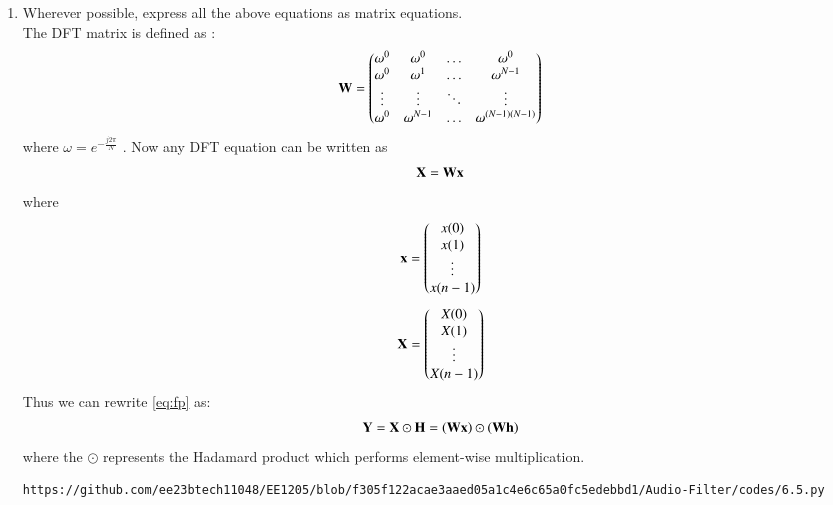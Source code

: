 \documentclass[journal,12pt,twocolumn]{IEEEtran}
\theoremstyle{remark}
\begin{document}
\begin{enumerate}[label=\thesection.\arabic*,ref=\thesection.\theenumi]
\item Wherever possible, express all the above equations as matrix equations.\\
\solution The DFT matrix is defined as : 
\begin{align}
	\mathbf{W} = 
	\begin{pmatrix}
		\omega^0 & \omega^0 & \ldots & \omega^0 \\
		\omega^0 & \omega^1 & \ldots & \omega^{N - 1} \\
		\vdots & \vdots & \ddots & \vdots \\
		\omega^0 & \omega^{N - 1} & \ldots & \omega^{(N -1)(N - 1)}
	\end{pmatrix}
\end{align}
where $\omega=e^{-\frac{j2\pi}{N}}$ . Now any DFT equation can be written as
\begin{align}
    \mathbf{X} = \mathbf{W}\mathbf{x}
\end{align}
\noindent where
\begin{align}
	\mathbf{x} = 
	\begin{pmatrix}
		x(0) \\ x(1) \\ \vdots \\ x(n - 1)
	\end{pmatrix}
\end{align}
\begin{align}
	\mathbf{X} = 
	\begin{pmatrix}
		X(0) \\ X(1) \\ \vdots \\ X(n - 1)
	\end{pmatrix}
\end{align}
Thus we can rewrite  \eqref{eq:fp} as:
\begin{align}
	\mathbf{Y} = \mathbf{X}\odot\mathbf{H} = \left(\mathbf{W}\mathbf{x}\right)\odot\left(\mathbf{W}\mathbf{h}\right)
\end{align}
where the $\odot$ represents the Hadamard product which performs element-wise multiplication.
\begin{lstlisting}
https://github.com/ee23btech11048/EE1205/blob/f305f122acae3aaed05a1c4e6c65a0fc5edebbd1/Audio-Filter/codes/6.5.py
\end{lstlisting}
\begin{figure}[H]
\centering

\end{figure}
\end{enumerate}
\end{document}
